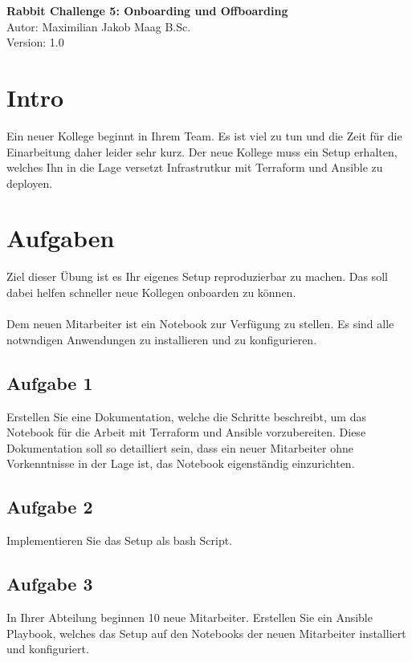 \documentclass{article}
\begin{document}
    \begin{center}
        \Large \textbf{Rabbit Challenge 5: Onboarding und Offboarding} \\ [6pt]
        \normalsize
        Autor: Maximilian Jakob Maag B.Sc. \\
        Version: 1.0
    \end{center}

    \section{Intro}
    Ein neuer Kollege beginnt in Ihrem Team.
    Es ist viel zu tun und die Zeit für die Einarbeitung daher leider sehr kurz.
    Der neue Kollege muss ein Setup erhalten, welches Ihn in die Lage versetzt Infrastrutkur 
    mit Terraform und Ansible zu deployen.

    \section{Aufgaben}
    Ziel dieser Übung ist es Ihr eigenes Setup reproduzierbar zu machen.
    Das soll dabei helfen schneller neue Kollegen onboarden zu können. \\ \\
    Dem neuen Mitarbeiter ist ein Notebook zur Verfügung zu stellen. Es sind alle notwndigen Anwendungen zu installieren und 
    zu konfigurieren.

    \subsection{Aufgabe 1}
    Erstellen Sie eine Dokumentation, welche die Schritte beschreibt, um das Notebook für die Arbeit mit Terraform und Ansible vorzubereiten.
    Diese Dokumentation soll so detailliert sein, dass ein neuer Mitarbeiter ohne Vorkenntnisse in der Lage ist, das Notebook eigenständig einzurichten.
    
    \subsection{Aufgabe 2}
    Implementieren Sie das Setup als bash Script.

    \subsection{Aufgabe 3}
    In Ihrer Abteilung beginnen 10 neue Mitarbeiter. 
    Erstellen Sie ein Ansible Playbook, welches das Setup auf den Notebooks der neuen Mitarbeiter installiert und konfiguriert.
\end{document}
